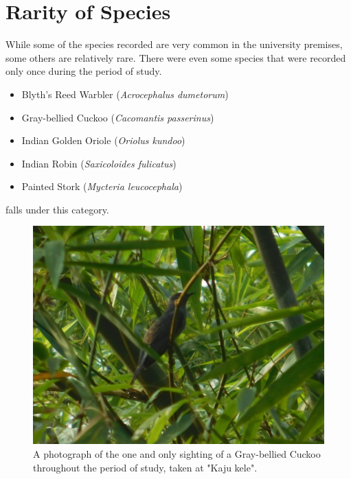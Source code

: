 \section{Rarity of Species}
While some of the species recorded are very common in the university premises, some others are relatively rare. There were even some species that were recorded only once during the period of study.
\begin{itemize}
    \item Blyth's Reed Warbler (\textit{Acrocephalus dumetorum})
    \item Gray-bellied Cuckoo (\textit{Cacomantis passerinus})
    \item Indian Golden Oriole (\textit{Oriolus kundoo})
    \item Indian Robin (\textit{Saxicoloides fulicatus})
    \item Painted Stork (\textit{Mycteria leucocephala})
\end{itemize}
falls under this category.
\begin{figure}[!htpb]
    \centering
    \includegraphics[width=\linewidth]{Figures/gray-bellied-cuckoo.JPG}
    \caption[]{A photograph of the one and only sighting of a Gray-bellied Cuckoo throughout the period of study, taken at "Kaju kele".}
    \label{fig:figure-01}
\end{figure}

